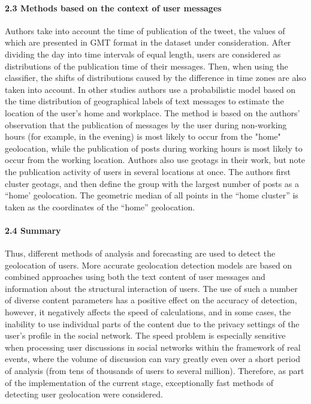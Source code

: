 \paragraph{2.3 Methods based on the context of user messages} Authors \cite{MahmudNicholsDrews,MahmudNicholsDrews2014} take into account the time of publication of the tweet, the values of which are presented in GMT format in the dataset under consideration. After dividing the day into time intervals of equal length, users are considered as distributions of the publication time of their messages. Then, when using the classifier, the shifts of distributions caused by the difference in time zones are also taken into account. In other studies \cite{EfstathiadesAntoniadesPallis} authors use a probabilistic model based on the time distribution of geographical labels of text messages to estimate the location of the user's home and workplace. The method is based on the authors’ observation that the publication of messages by the user during non-working hours (for example, in the evening) is most likely to occur from the "home" geolocation, while the publication of posts during working hours is most likely to occur from the working location. Authors \cite{PoulstonStevensonBontcheva} also use geotags in their work, but note the publication activity of users in several locations at once. The authors first cluster geotags, and then define the group with the largest number of posts as a “home’ geolocation. The geometric median of all points in the “home cluster” is taken as the coordinates of the “home” geolocation.

\paragraph{2.4 Summary} Thus, different methods of analysis and forecasting are used to detect the geolocation of users. More accurate geolocation detection models are based on combined approaches using both the text content of user messages and information about the structural interaction of users. The use of such a number of diverse content parameters has a positive effect on the accuracy of detection, however, it negatively affects the speed of calculations, and in some cases, the inability to use individual parts of the content due to the privacy settings of the user's profile in the social network. The speed problem is especially sensitive when processing user discussions in social networks within the framework of real events, where the volume of discussion can vary greatly even over a short period of analysis (from tens of thousands of users to several million). Therefore, as part of the implementation of the current stage, exceptionally fast methods of detecting user geolocation were considered.

